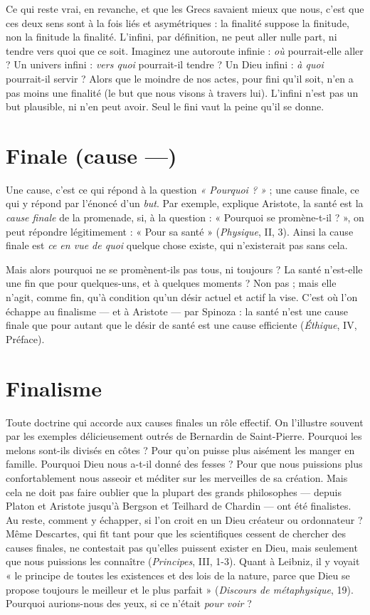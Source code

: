 Ce qui reste vrai, en revanche, et que les Grecs savaient mieux que nous,
c’est que ces deux sens sont à la fois liés et asymétriques : la finalité suppose la
finitude, non la finitude la finalité. L’infini, par définition, ne peut aller nulle
part, ni tendre vers quoi que ce soit. Imaginez une autoroute infinie : {\it où} pourrait-elle
aller ? Un univers infini : {\it vers quoi} pourrait-il tendre ? Un Dieu infini :
{\it à quoi} pourrait-il servir ? Alors que le moindre de nos actes, pour fini qu’il soit,
n’en a pas moins une finalité (le but que nous visons à travers lui). L’infini n’est
pas un but plausible, ni n’en peut avoir. Seul le fini vaut la peine qu’il se donne.

\section{Finale (cause —)}
Une cause, c’est ce qui répond à la question {\it « Pourquoi ? »} ;
une cause finale, ce qui y répond par l’énoncé
d’un {\it but}. Par exemple, explique Aristote, la santé est la {\it cause finale} de la promenade,
si, à la question : « Pourquoi se promène-t-il ? », on peut répondre
légitimement : « Pour sa santé » ({\it Physique}, II, 3). Ainsi la cause finale est {\it ce en
vue de quoi} quelque chose existe, qui n’existerait pas sans cela.

Mais alors pourquoi ne se promènent-ils pas tous, ni toujours ? La santé
n'est-elle une fin que pour quelques-uns, et à quelques moments ? Non pas ;
mais elle n’agit, comme fin, qu’à condition qu’un désir actuel et actif la vise.
C’est où l’on échappe au finalisme — et à Aristote — par Spinoza : la santé n’est
une cause finale que pour autant que le désir de santé est une cause efficiente
({\it Éthique}, IV, Préface).

\section{Finalisme}
Toute doctrine qui accorde aux causes finales un rôle effectif.
On l’illustre souvent par les exemples délicieusement outrés de
Bernardin de Saint-Pierre. Pourquoi les melons sont-ils divisés en côtes ? Pour
qu’on puisse plus aisément les manger en famille. Pourquoi Dieu nous a-t-il
donné des fesses ? Pour que nous puissions plus confortablement nous asseoir
et méditer sur les merveilles de sa création. Mais cela ne doit pas faire oublier
que la plupart des grands philosophes — depuis Platon et Aristote jusqu’à
Bergson et Teilhard de Chardin — ont été finalistes. Au reste, comment y
échapper, si l’on croit en un Dieu créateur ou ordonnateur ? Même Descartes,
qui fit tant pour que les scientifiques cessent de chercher des causes finales, ne
contestait pas qu’elles puissent exister en Dieu, mais seulement que nous puissions
les connaître ({\it Principes}, III, 1-3). Quant à Leibniz, il y voyait « le principe
de toutes les existences et des lois de la nature, parce que Dieu se propose toujours
le meilleur et le plus parfait » ({\it Discours de métaphysique}, 19). Pourquoi
aurions-nous des yeux, si ce n’était {\it pour voir} ?

